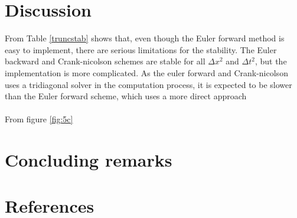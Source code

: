 \documentclass[10pt,a4paper]{article}
\begin{document}
\newpage
\section*{Discussion}

From Table \ref{truncstab} shows that, even though the Euler forward method is easy to implement, there are serious limitations for the stability. The Euler backward and Crank-nicolson schemes are stable for all $\Delta x^2$ and $\Delta t^2$, but the implementation is more complicated. As the euler forward and Crank-nicolson uses a tridiagonal solver in the computation process, it is expected to be slower than the Euler forward scheme, which uses a more direct approach
\\
\\
From figure \ref{fig:5c}



\newpage
\section*{Concluding remarks}





\newpage
\section*{References}
\end{document}
